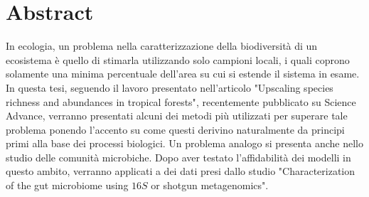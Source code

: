\chapter{Abstract}
 

%
%


In ecologia, un problema nella caratterizzazione della biodiversità di un ecosistema è quello di stimarla utilizzando solo campioni locali, i quali coprono solamente una minima percentuale dell'area su cui si estende il sistema in esame. In questa tesi, seguendo il lavoro presentato nell'articolo "Upscaling species richness and abundances in tropical forests"\cite{Tovoe1701438}, recentemente pubblicato su Science Advance, verranno presentati alcuni dei metodi più utilizzati per superare tale problema ponendo l'accento su come questi derivino naturalmente da principi primi alla base dei processi biologici. Un problema analogo si presenta anche nello studio delle comunità microbiche.\newline
Dopo aver testato l'affidabilità dei modelli in questo ambito, verranno applicati a dei dati presi dallo studio "Characterization of the gut microbiome using $16S$ or shotgun metagenomics"\cite{shotgun}.